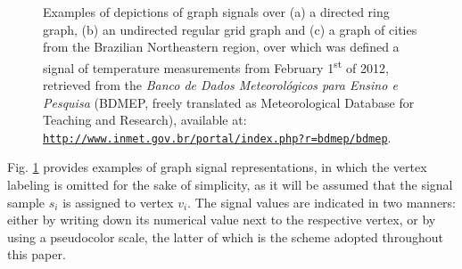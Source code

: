 \begin{figure}
	\centering
    \caption{Examples of depictions of graph signals over (a) a directed ring graph,
		(b) an undirected regular grid graph and (c) a graph of cities from the Brazilian Northeastern region, over which was defined a signal of temperature measurements from February 1\textsuperscript{st} of 2012, retrieved from the
		\emph{Banco de Dados Meteorol\'ogicos para Ensino e Pesquisa} (BDMEP, freely translated as Meteorological Database for Teaching and Research), available at: \texttt{\url{http://www.inmet.gov.br/portal/index.php?r=bdmep/bdmep}}.}%
	\floatsource
	\label{fig:graphs}%
	\vspace{-0.2cm}
\end{figure}

Fig. \ref{fig:graphs} provides examples of graph signal representations, in which the vertex labeling is omitted for the sake of simplicity, as it will be assumed that the signal sample $ s_i $ is assigned to vertex $ v_i $. The signal values are indicated in two manners: either by writing down its numerical value next to the respective vertex, or by using a pseudocolor scale, the latter of which is the scheme adopted throughout this paper.

